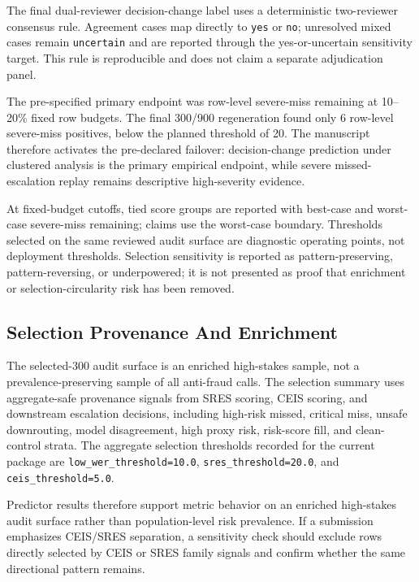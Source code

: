 \documentclass[
]{article}
\begin{document}
The final dual-reviewer decision-change label uses a deterministic
two-reviewer consensus rule. Agreement cases map directly to
\texttt{yes} or \texttt{no}; unresolved mixed cases remain
\texttt{uncertain} and are reported through the yes-or-uncertain
sensitivity target. This rule is reproducible and does not claim a
separate adjudication panel.

The pre-specified primary endpoint was row-level severe-miss remaining
at 10--20\% fixed row budgets. The final 300/900 regeneration found only
6 row-level severe-miss positives, below the planned threshold of 20.
The manuscript therefore activates the pre-declared failover:
decision-change prediction under clustered analysis is the primary
empirical endpoint, while severe missed-escalation replay remains
descriptive high-severity evidence.

At fixed-budget cutoffs, tied score groups are reported with best-case
and worst-case severe-miss remaining; claims use the worst-case
boundary. Thresholds selected on the same reviewed audit surface are
diagnostic operating points, not deployment thresholds. Selection
sensitivity is reported as pattern-preserving, pattern-reversing, or
underpowered; it is not presented as proof that enrichment or
selection-circularity risk has been removed.

\hypertarget{selection-provenance-and-enrichment}{%
\subsection{Selection Provenance And
Enrichment}\label{selection-provenance-and-enrichment}}

The selected-300 audit surface is an enriched high-stakes sample, not a
prevalence-preserving sample of all anti-fraud calls. The selection
summary uses aggregate-safe provenance signals from SRES scoring, CEIS
scoring, and downstream escalation decisions, including high-risk
missed, critical miss, unsafe downrouting, model disagreement, high
proxy risk, risk-score fill, and clean-control strata. The aggregate
selection thresholds recorded for the current package are
\texttt{low\_wer\_threshold=10.0}, \texttt{sres\_threshold=20.0}, and
\texttt{ceis\_threshold=5.0}.

Predictor results therefore support metric behavior on an enriched
high-stakes audit surface rather than population-level risk prevalence.
If a submission emphasizes CEIS/SRES separation, a sensitivity check
should exclude rows directly selected by CEIS or SRES family signals and
confirm whether the same directional pattern remains.
\end{document}
